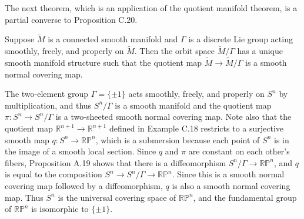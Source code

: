 The next theorem, which is an application of the quotient manifold theorem, is a partial converse to Proposition C.20.

\begin{proposition}\label{prop:quotient-orbit-space-covering-map}
Suppose $\widetilde{M}$ is a connected smooth manifold and $\Gamma$ is a discrete Lie group acting smoothly, freely, and properly on $\widetilde{M}$. Then the orbit space $\widetilde{M}/\Gamma$ has a unique smooth manifold structure such that the quotient map $\widetilde{M} \to \widetilde{M}/\Gamma$ is a smooth normal covering map.
\end{proposition}

\begin{example}\label{ex:universal-covering-projective-space}
The two-element group $\Gamma = \{\pm 1\}$ acts smoothly, freely, and properly on $S^n$ by multiplication, and thus $S^n/\Gamma$ is a smooth manifold and the quotient map $\pi: S^n \to S^n/\Gamma$ is a two-sheeted smooth normal covering map. Note also that the quotient map $\mathbb{R}^{n+1} \to \mathbb{R}^{n+1}$ defined in Example C.18 restricts to a surjective smooth map $q: S^n \to \mathbb{RP}^n$, which is a submersion because each point of $S^n$ is in the image of a smooth local section. Since $q$ and $\pi$ are constant on each other's fibers, Proposition A.19 shows that there is a diffeomorphism $S^n/\Gamma \to \mathbb{RP}^n$, and $q$ is equal to the composition $S^n \to S^n/\Gamma \to \mathbb{RP}^n$. Since this is a smooth normal covering map followed by a diffeomorphism, $q$ is also a smooth normal covering map. Thus $S^n$ is the universal covering space of $\mathbb{RP}^n$, and the fundamental group of $\mathbb{RP}^n$ is isomorphic to $\{\pm 1\}$.
\end{example}
